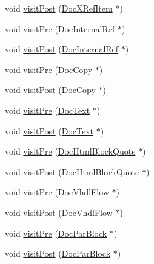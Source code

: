 \begin{DoxyCompactItemize}
\item 
void \hyperlink{class_docbook_doc_visitor_ae9a1b24b1069a0427f0b39a8b41bc32d}{visit\+Post} (\hyperlink{class_doc_x_ref_item}{Doc\+X\+Ref\+Item} $\ast$)
\item 
void \hyperlink{class_docbook_doc_visitor_a992c92b8099a14a91d81b7cbfafc523c}{visit\+Pre} (\hyperlink{class_doc_internal_ref}{Doc\+Internal\+Ref} $\ast$)
\item 
void \hyperlink{class_docbook_doc_visitor_abf985a633b062cf2b37785a2a32b84ae}{visit\+Post} (\hyperlink{class_doc_internal_ref}{Doc\+Internal\+Ref} $\ast$)
\item 
void \hyperlink{class_docbook_doc_visitor_aa26c19a65936021e2053be97cf3d5cd5}{visit\+Pre} (\hyperlink{class_doc_copy}{Doc\+Copy} $\ast$)
\item 
void \hyperlink{class_docbook_doc_visitor_afe8f482254a0aa81ce159212d482da44}{visit\+Post} (\hyperlink{class_doc_copy}{Doc\+Copy} $\ast$)
\item 
void \hyperlink{class_docbook_doc_visitor_a3f864c1da99a406e5444f8de4884f868}{visit\+Pre} (\hyperlink{class_doc_text}{Doc\+Text} $\ast$)
\item 
void \hyperlink{class_docbook_doc_visitor_a2fef52f5bd199a2e15b12a10ef79e5dc}{visit\+Post} (\hyperlink{class_doc_text}{Doc\+Text} $\ast$)
\item 
void \hyperlink{class_docbook_doc_visitor_a4ccc3f4bf84c2675233a8787efdee93e}{visit\+Pre} (\hyperlink{class_doc_html_block_quote}{Doc\+Html\+Block\+Quote} $\ast$)
\item 
void \hyperlink{class_docbook_doc_visitor_a3a34e10eee1b9900a5dea554a910aa0b}{visit\+Post} (\hyperlink{class_doc_html_block_quote}{Doc\+Html\+Block\+Quote} $\ast$)
\item 
void \hyperlink{class_docbook_doc_visitor_a0bd8b8b70ddf7c187c40057af5469835}{visit\+Pre} (\hyperlink{class_doc_vhdl_flow}{Doc\+Vhdl\+Flow} $\ast$)
\item 
void \hyperlink{class_docbook_doc_visitor_ae66ac181ae326487c4a3dee972acd1f5}{visit\+Post} (\hyperlink{class_doc_vhdl_flow}{Doc\+Vhdl\+Flow} $\ast$)
\item 
void \hyperlink{class_docbook_doc_visitor_a1c3dbcaf7903491fc49aeae4e0b0a64b}{visit\+Pre} (\hyperlink{class_doc_par_block}{Doc\+Par\+Block} $\ast$)
\item 
void \hyperlink{class_docbook_doc_visitor_a9f0567de266ad5486fa5db610059ae34}{visit\+Post} (\hyperlink{class_doc_par_block}{Doc\+Par\+Block} $\ast$)
\end{DoxyCompactItemize}


